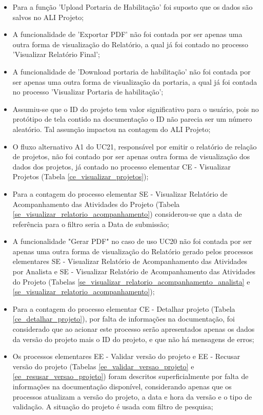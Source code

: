  \begin{itemize}
   \item Para a função 'Upload Portaria de Habilitação' foi suposto que os dados são salvos no ALI Projeto;
   
   \item A funcionalidade de 'Exportar PDF' não foi contada por ser apenas uma outra forma de visualização do Relatório, a qual já foi contado
   no processo 'Visualizar Relatório Final';
   
   \item A funcionalidade de 'Download portaria de habilitação' não foi contada por ser apenas uma outra forma de visualização da portaria, a qual
   já foi contada no processo 'Visualizar Portaria de habilitação';
   
   \item Assumiu-se que o ID do projeto tem valor significativo para o usuário, pois no protótipo de tela contido na documentação o ID não 
    parecia ser um número aleatório. Tal assunção impactou na contagem do ALI Projeto;
   
   \item O fluxo alternativo A1 do UC21, responsável por emitir o relatório de relação de projetos, não foi contado por ser apenas outra forma
    de visualização dos dados dos projetos, já contado no processo elementar CE - Visualizar Projetos (Tabela \ref{ce_visualizar_projetos});
   
   \item Para a contagem do processo elementar SE - Visualizar Relatório de Acompanhamento das Atividades do Projeto
    (Tabela \ref{se_visualizar_relatorio_acompanhamento}) considerou-se que a data de referência para o filtro seria a Data de submissão;
    
   \item A funcionalidade "Gerar PDF" no caso de uso UC20 não foi contada por ser apenas uma outra forma de visualização do Relatório gerado
     pelos processos elementares SE - Visualizar Relatório de Acompanhamento das Atividades por Analista e 
     SE - Visualizar Relatório de Acompanhamento das Atividades do Projeto
     (Tabelas \ref{se_visualizar_relatorio_acompanhamento_analista} e \ref{se_visualizar_relatorio_acompanhamento});
     
   \item Para a contagem do processo elementar CE - Detalhar projeto (Tabela \ref{ce_detalhar_projeto}), por falta de informações na documentação,
     foi considerado que ao acionar este processo serão apresentados apenas os dados da versão do projeto mais o ID do projeto, e que não há 
     mensagens de erros;
     
   \item Os processos elementares EE - Validar versão do projeto e EE - Recusar versão do projeto 
    (Tabelas \ref{ee_validar_versao_projeto} e \ref{ee_resusar_versao_projeto}) foram descritos superficialmente por falta de informações
    na documentação disponível, considerando apenas que os processos atualizam a versão do projeto, a data e hora da versão e o tipo 
    de validação. A situação do projeto é usada com filtro de pesquisa;
  \end{itemize}

